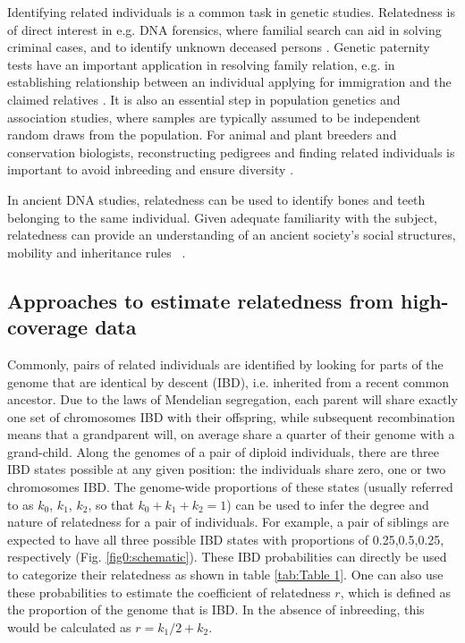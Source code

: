 \documentclass[12pt, letterpaper]{article}
\begin{document}
Identifying related individuals is a common task in genetic studies. Relatedness is of direct interest in e.g. DNA forensics, where familial search can aid in solving criminal cases, and to identify unknown deceased persons \cite{murphy_law_2018,ram_genealogy_2018}. Genetic paternity tests have an important application in resolving family relation, e.g. in establishing relationship between an individual applying for immigration and the claimed relatives \cite{egeland_beyond_2000}. It is also an essential step in population genetics and association studies, where samples are typically assumed to be independent random draws from the population. For animal and plant breeders and conservation biologists, reconstructing pedigrees and finding related individuals is important to avoid inbreeding and ensure diversity \cite{habier_impact_2007,oliehoek_estimating_2006,kardos_measuring_2015}.

In ancient DNA studies, relatedness can be used to identify bones and teeth belonging to the same individual. Given adequate familiarity with the subject, relatedness can provide an understanding of an ancient society's social structures, mobility and inheritance rules ~\cite{baca_ancient_2012,mittnik_kinship-based_2019,sikora_ancient_2017}.


\subsection{Approaches to estimate relatedness from high-coverage data}

Commonly, pairs of related individuals are identified by looking for parts of the genome that are identical by descent (IBD), i.e. inherited from a recent common ancestor. Due to the laws of Mendelian segregation, each parent will share exactly one set of chromosomes IBD with their offspring, while subsequent recombination means that a grandparent will, on average share a quarter of their genome with a grand-child. Along the genomes of a pair of diploid individuals, there are three IBD states possible at any given position: the individuals share zero, one or two chromosomes IBD. The genome-wide proportions of these states (usually referred to as $k_0$, $k_1$, $k_2$, so that $k_0+k_1+k_2=1$) can be used to infer the degree and nature of relatedness for a pair of individuals. For example, a pair of siblings are expected to have all three possible IBD states with proportions of 0.25,0.5,0.25, respectively (Fig. \ref{fig0:schematic}). These IBD probabilities can directly be used to categorize their relatedness as shown in table \ref{tab:Table 1}. One can also use these probabilities to estimate the coefficient of relatedness $r$, which is defined as the proportion of the genome that is IBD. In the absence of inbreeding, this would be calculated as $r= k_1/2 + k_2$.
\end{document}
